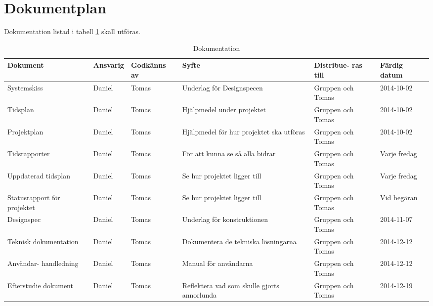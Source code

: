 \section{Dokumentplan}
Dokumentation listad i tabell \ref{dokumentation:tabell} skall utföras.

\begin{table}[h]
	\centering
		\begin{tabularx}{\textwidth}{| p{22mm} | l | X | p{25mm} | X | l |}
			\hline
	\textbf{Dokument} & \textbf{Ansvarig} & \textbf{Godkänns av} & \textbf{Syfte} & \textbf{Distribue-
  ras till} & \textbf{Färdig datum} \\
			\hline

     {Systemskiss} & {Daniel} & {Tomas}& {Underlag för Designspecen} & {Gruppen och Tomas} & {2014-10-02} \\
      \hline
          {Tidsplan} & {Daniel} & {Tomas}& {Hjälpmedel under projektet} & {Gruppen och Tomas} & {2014-10-02} \\
      \hline
          {Projektplan} & {Daniel} & {Tomas}& {Hjälpmedel för hur projektet ska utföras} & {Gruppen och Tomas} & {2014-10-02} \\
      \hline
          {Tidsrapporter} & {Daniel} & {Tomas}& {För att kunna se så alla bidrar} & {Gruppen och Tomas} & {Varje fredag} \\
      \hline
                {Uppdaterad tidsplan} & {Daniel} & {Tomas}& {Se hur projektet ligger till} & {Gruppen och Tomas} & {Varje fredag} \\
      \hline
                      {Statusrapport för projektet} & {Daniel} & {Tomas}& {Se hur projektet ligger till} & {Gruppen och Tomas} & {Vid begäran} \\
      \hline
      
                {Designspec} & {Daniel} & {Tomas}& {Underlag för konstruktionen} & {Gruppen och Tomas} & {2014-11-07} \\
      \hline
                      {Teknisk 
                      dokumentation} & {Daniel} & {Tomas}& {Dokumentera de tekniska lösningarna} & {Gruppen och Tomas} & {2014-12-12} \\
      \hline
                            {Användar-
                            handledning} & {Daniel} & {Tomas}& {Manual för användarna} & {Gruppen och Tomas} & {2014-12-12} \\
      \hline
  {Efterstudie
  dokument} & {Daniel} & {Tomas}& {Reflektera vad som skulle gjorts annorlunda} & {Gruppen och Tomas} & {2014-12-19} \\
      \hline
      
		\end{tabularx}
	\caption{Dokumentation} \label{dokumentation:tabell}
\end{table}